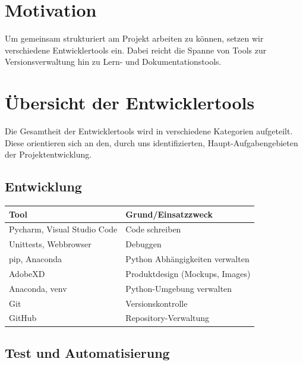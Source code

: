 \documentclass[a4paper,11pt]{scrartcl}
\begin{document}


\section{Motivation}

Um gemeinsam strukturiert am Projekt arbeiten zu können, setzen wir verschiedene Entwicklertools ein.
Dabei reicht die Spanne von Tools zur Versionsverwaltung hin zu Lern- und Dokumentationstools.

\section{Übersicht der Entwicklertools}

Die Gesamtheit der Entwicklertools wird in verschiedene Kategorien aufgeteilt.
Diese orientieren sich an den, durch uns identifizierten, Haupt-Aufgabengebieten der Projektentwicklung.

\subsection{Entwicklung}

\begin{table}[H]
\begin{center}
\begin{tabular}{|p{4cm}|p{8cm}|}
\hline
\textbf{Tool} &\textbf{Grund/Einsatzzweck} \\ \hline
Pycharm, Visual Studio Code & Code schreiben \\ \hline
Unittests, Webbrowser & Debuggen\\ \hline
pip, Anaconda & Python Abhängigkeiten verwalten\\ \hline
AdobeXD & Produktdesign (Mockups, Images)\\ \hline
Anaconda, venv & Python-Umgebung verwalten\\ \hline
Git & Versionskontrolle\\ \hline
GitHub & Repository-Verwaltung\\ \hline    
\end{tabular}
\end{center}
\end{table}

\subsection{Test und Automatisierung}
\end{document}

